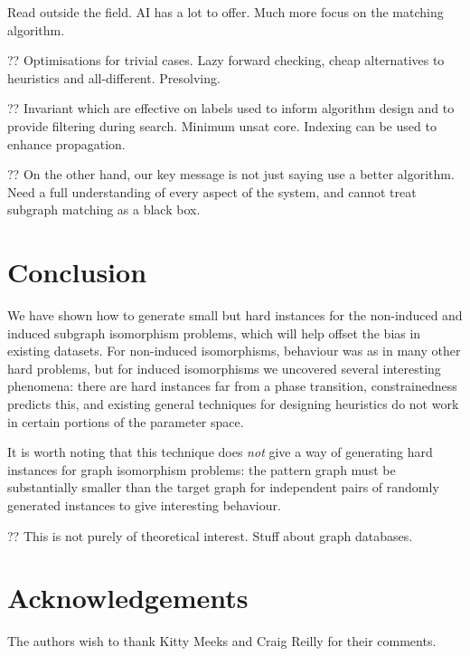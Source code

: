 \documentclass[twoside,11pt]{article}
\begin{document}
Read outside the field. AI has a lot to offer. Much more focus on the matching algorithm.

?? Optimisations for trivial cases. Lazy forward checking, cheap alternatives to heuristics and
all-different. Presolving.

?? Invariant which are effective on labels used to inform algorithm design and to provide filtering
during search. Minimum unsat core. Indexing can be used to enhance propagation.

?? On the other hand, our key message is not just saying use a better algorithm. Need a full
understanding of every aspect of the system, and cannot treat subgraph matching as a black box.

\section{Conclusion}

We have shown how to generate small but hard instances for the non-induced and induced subgraph
isomorphism problems, which will help offset the bias in existing datasets. For non-induced
isomorphisms, behaviour was as in many other hard problems, but for induced isomorphisms we
uncovered several interesting phenomena: there are hard instances far from a phase transition,
constrainedness predicts this, and existing general techniques for designing heuristics do not work
in certain portions of the parameter space.

It is worth noting that this technique does \emph{not} give a way of generating hard instances for
graph isomorphism problems: the pattern graph must be substantially smaller than the target graph
for independent pairs of randomly generated instances to give interesting behaviour.

?? This is not purely of theoretical interest. Stuff about graph databases.

\section*{Acknowledgements}

The authors wish to thank Kitty Meeks and Craig Reilly for their comments.



\end{document}

